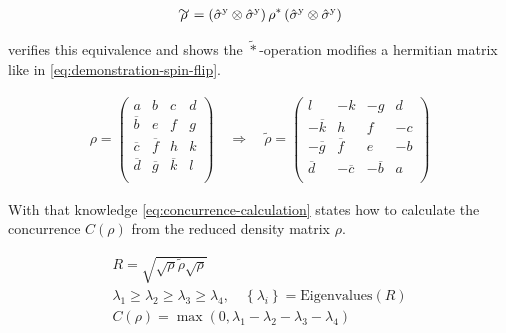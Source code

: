\begin{equation}
    \label{eq:spin-flip}
    \begin{split}
        \tilde{\rho} = \left(\pauli[]{y} \otimes \pauli[]{y}\right) \rho^\ast  \left(\pauli[]{y} \otimes \pauli[]{y}\right)
    \end{split}
\end{equation}

 verifies this equivalence and shows the ${\tilde{\ast}}$-operation modifies a hermitian matrix like in \autoref{eq:demonstration-spin-flip}.

\begin{equation}
    \label{eq:demonstration-spin-flip}
    \begin{split}
        \rho = \left(\begin{matrix}
            a& b & c &d \\
            \overline{b}& e & f &g \\
            \overline{c}& \overline{f} & h &k \\
            \overline{d}& \overline{g} & \overline{k} &l \\
        \end{matrix}\right)  \quad\Rightarrow\quad\tilde{\rho} = 
        \left(\begin{matrix}
            l& -k & -g &d \\
            -\overline{k}& h & f &-c \\
            -\overline{g}& \overline{f} & e &-b \\
            \overline{d}& -\overline{c} & -\overline{b} &a \\
        \end{matrix}\right) 
    \end{split}
\end{equation}

With that knowledge \autoref{eq:concurrence-calculation} states how to calculate the concurrence $C(\rho)$ from the reduced density matrix $\rho$.

\begin{equation}
    \label{eq:concurrence-calculation}
    \begin{gathered}
        R = \sqrt{\sqrt{\rho}\tilde{\rho}\sqrt{\rho}}\\
        \lambda_1 \geq \lambda_2 \geq \lambda_3 \geq \lambda_4, \quad \left\{\lambda_i\right\} = \text{Eigenvalues}(R)\\
        C(\rho) = \max (0, \lambda_1 - \lambda_2 - \lambda_3 - \lambda_4)
    \end{gathered}
\end{equation}

